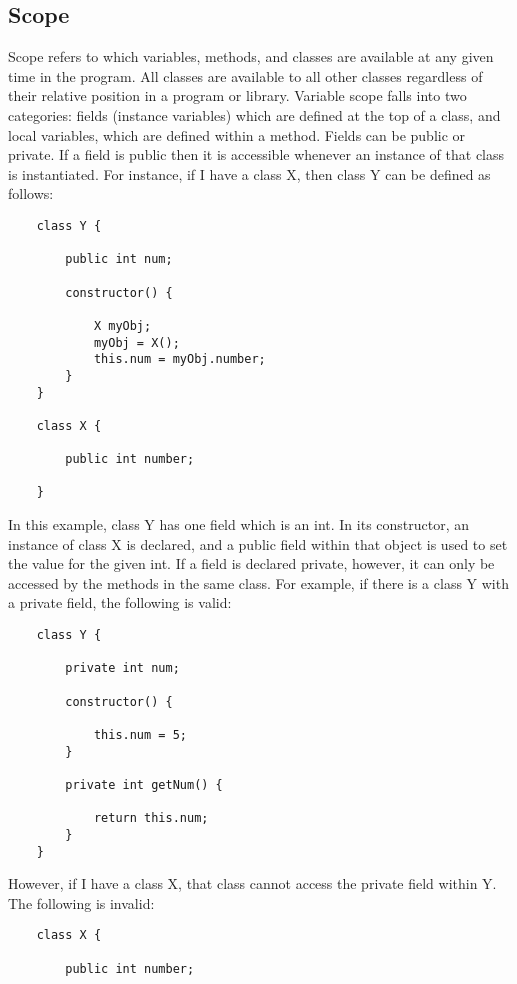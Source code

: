 \begin{homeworkProblem}
	
	\subsection{Scope}
		
		
	Scope refers to which variables, methods, and classes are available at any given time in the program. All classes are available to all other classes regardless of their relative position in a program or library. Variable scope falls into two categories: fields (instance variables) which are defined at the top of a class, and local variables, which are defined within a method. Fields can be public or private. If a field is public then it is accessible whenever an instance of that class is instantiated. For instance, if I have a class X, then class Y can be defined as follows:
	
	\begin{verbatim}
	class Y {
		
		public int num;
		
		constructor() {
			
			X myObj;
			myObj = X();
			this.num = myObj.number;
		}
	}
	
	class X {
		
		public int number;
		
	}
	\end{verbatim}
	
	In this example, class Y has one field which is an int. In its constructor, an instance of class X is declared, and a public field within that object is used to set the value for the given int. If a field is declared private, however, it can only be accessed by the methods in the same class. For example, if there is a class Y with a private field, the following is valid:
	
	\begin{verbatim}
	class Y {
		
		private int num;
		
		constructor() {
			
			this.num = 5;
		}
		
		private int getNum() {
			
			return this.num;
		}
	}
	\end{verbatim}
		
		However, if I have a class X, that class cannot access the private field within Y. The following is invalid:
	\begin{verbatim}
	class X {
	
		public int number;
	

\end{verbatim}
\end{homeworkProblem}
